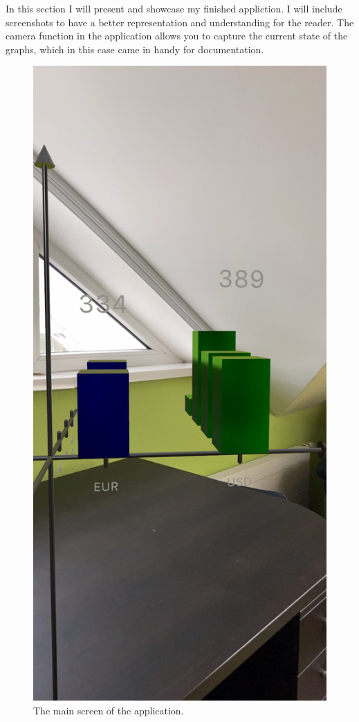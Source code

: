 \documentclass{report}
\begin{document}
In this section I will present and showcase my finished appliction. I will include screenshots to have a better representation and understanding for the reader.
The camera function in the application allows you to capture the current state of the graphs, which in this case came in handy for documentation.


\begin{figure}[!ht]
  \centering
  \includegraphics[scale=0.2]{front.jpeg}
  \caption{The main screen of the application.}
  \label{fig:TexnicCenter}
\end{figure}
\end{document}
